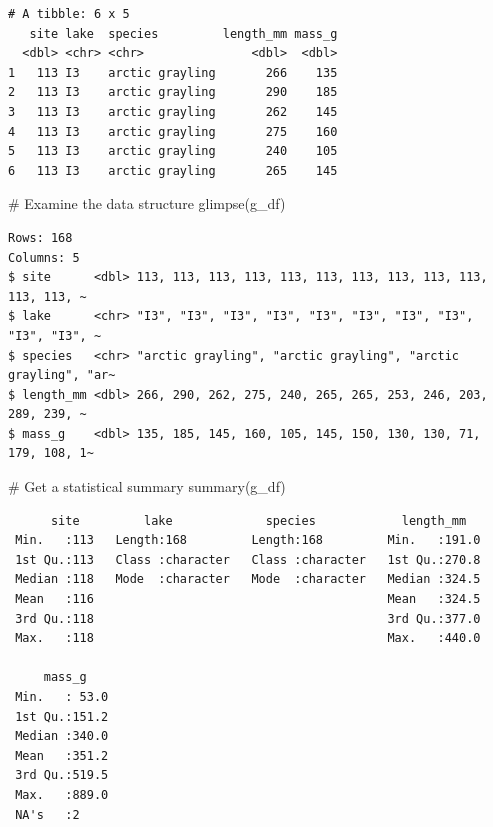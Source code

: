 \documentclass[
]{article}
\newenvironment{Shaded}{}{}
\newcommand{\CommentTok}[1]{\textcolor[rgb]{0.42,0.45,0.49}{#1}}
\newcommand{\FunctionTok}[1]{\textcolor[rgb]{0.44,0.26,0.76}{#1}}
\newcommand{\NormalTok}[1]{\textcolor[rgb]{0.14,0.16,0.18}{#1}}
\begin{document}
\begin{tcolorbox}
\begin{verbatim}
# A tibble: 6 x 5
   site lake  species         length_mm mass_g
  <dbl> <chr> <chr>               <dbl>  <dbl>
1   113 I3    arctic grayling       266    135
2   113 I3    arctic grayling       290    185
3   113 I3    arctic grayling       262    145
4   113 I3    arctic grayling       275    160
5   113 I3    arctic grayling       240    105
6   113 I3    arctic grayling       265    145
\end{verbatim}

\end{tcolorbox}

\begin{Shaded}
\begin{Highlighting}[]
\CommentTok{\# Examine the data structure}
\FunctionTok{glimpse}\NormalTok{(g\_df)}
\end{Highlighting}
\end{Shaded}

\begin{verbatim}
Rows: 168
Columns: 5
$ site      <dbl> 113, 113, 113, 113, 113, 113, 113, 113, 113, 113, 113, 113, ~
$ lake      <chr> "I3", "I3", "I3", "I3", "I3", "I3", "I3", "I3", "I3", "I3", ~
$ species   <chr> "arctic grayling", "arctic grayling", "arctic grayling", "ar~
$ length_mm <dbl> 266, 290, 262, 275, 240, 265, 265, 253, 246, 203, 289, 239, ~
$ mass_g    <dbl> 135, 185, 145, 160, 105, 145, 150, 130, 130, 71, 179, 108, 1~
\end{verbatim}

\begin{Shaded}
\begin{Highlighting}[]
\CommentTok{\# Get a statistical summary}
\FunctionTok{summary}\NormalTok{(g\_df)}
\end{Highlighting}
\end{Shaded}

\begin{verbatim}
      site         lake             species            length_mm    
 Min.   :113   Length:168         Length:168         Min.   :191.0  
 1st Qu.:113   Class :character   Class :character   1st Qu.:270.8  
 Median :118   Mode  :character   Mode  :character   Median :324.5  
 Mean   :116                                         Mean   :324.5  
 3rd Qu.:118                                         3rd Qu.:377.0  
 Max.   :118                                         Max.   :440.0  
                                                                    
     mass_g     
 Min.   : 53.0  
 1st Qu.:151.2  
 Median :340.0  
 Mean   :351.2  
 3rd Qu.:519.5  
 Max.   :889.0  
 NA's   :2      
\end{verbatim}
\end{document}
